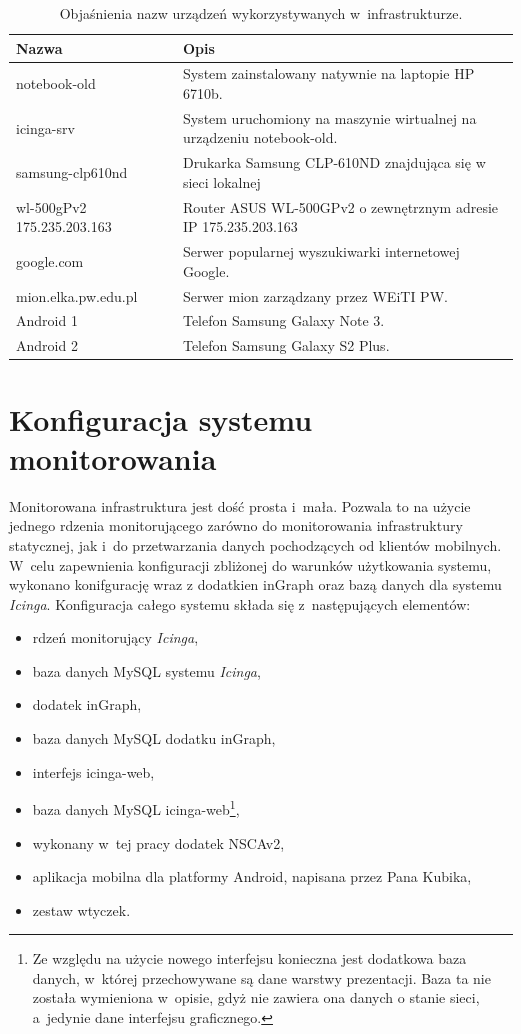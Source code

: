 \begin{table}
\centering
\caption{Objaśnienia nazw urządzeń wykorzystywanych w~infrastrukturze.}
\label{tab:devices}
\begin{tabular}{|p{4cm}||p{10cm}|}
  \hline
  Nazwa & Opis \\
  \hline \hline
  notebook-old & System zainstalowany natywnie na laptopie HP 6710b. \\
  \hline
  icinga-srv & System uruchomiony na maszynie wirtualnej na urządzeniu notebook-old. \\
  \hline
  samsung-clp610nd & Drukarka Samsung CLP-610ND znajdująca się w sieci lokalnej \\
  \hline
  \raggedright{wl-500gPv2 175.235.203.163} & \raggedright{Router ASUS WL-500GPv2 o zewnętrznym adresie IP 175.235.203.163}
  \tabularnewline
  \hline
  google.com & Serwer popularnej wyszukiwarki internetowej Google. \\
  \hline
  mion.elka.pw.edu.pl & Serwer mion zarządzany przez WEiTI PW. \\
  \hline
  Android 1 & Telefon Samsung Galaxy Note 3. \\
  \hline
  Android 2 & Telefon Samsung Galaxy S2 Plus. \\
  \hline
\end{tabular}
\end{table}

\section[Konfiguracja systemu monitorowania][Konfiguracja systemu
monitorowania]{Konfiguracja systemu monitorowania}

Monitorowana infrastruktura jest dość prosta i~mała. Pozwala to na
użycie jednego rdzenia monitorującego zarówno do monitorowania
infrastruktury statycznej, jak i~do przetwarzania danych pochodzących
od klientów mobilnych. W~celu zapewnienia konfiguracji zbliżonej do
warunków użytkowania systemu, wykonano konifgurację wraz z dodatkien
inGraph oraz bazą danych dla systemu {\em Icinga}. Konfiguracja całego
systemu składa się z~następujących elementów:

\begin{itemize}
\item rdzeń monitorujący {\em Icinga},
\item baza danych MySQL systemu {\em Icinga},
\item dodatek inGraph,
\item baza danych MySQL dodatku inGraph,
\item interfejs icinga-web,
\item baza danych MySQL icinga-web\footnote{Ze względu na użycie
    nowego interfejsu konieczna jest dodatkowa baza danych, w~której
    przechowywane są dane warstwy prezentacji. Baza ta nie została
    wymieniona w~opisie, gdyż nie zawiera ona danych o stanie sieci,
    a~jedynie dane interfejsu graficznego.},
\item wykonany w~tej pracy dodatek NSCAv2,
\item aplikacja mobilna dla platformy Android, napisana przez Pana
  Kubika,
\item zestaw wtyczek.
\end{itemize}

